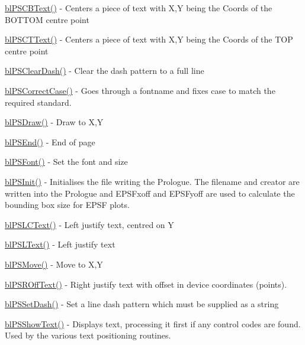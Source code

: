 \begin{DoxyItemize}
\item \hyperlink{ps_8c_ab05b586a42f786be51c5d36d41f7cb3c}{bl\-P\-S\-C\-B\-Text()} -\/ Centers a piece of text with X,Y being the Coords of the B\-O\-T\-T\-O\-M centre point
\item \hyperlink{ps_8c_af2c63afacbd6d47924bbb37724dee9e0}{bl\-P\-S\-C\-T\-Text()} -\/ Centers a piece of text with X,Y being the Coords of the T\-O\-P centre point
\item \hyperlink{ps_8c_ad49ff55fbd6be532c541cba2e7988b3b}{bl\-P\-S\-Clear\-Dash()} -\/ Clear the dash pattern to a full line
\item \hyperlink{ps_8c_a7593cf7ac25f517c2c7345fb9eb6c8b1}{bl\-P\-S\-Correct\-Case()} -\/ Goes through a fontname and fixes case to match the required standard.
\item \hyperlink{ps_8c_a86d363d40c83b86541ec7b2f54a986e4}{bl\-P\-S\-Draw()} -\/ Draw to X,Y
\item \hyperlink{ps_8c_a6c3a0f38cfad943f106bdcfc68c8d834}{bl\-P\-S\-End()} -\/ End of page
\item \hyperlink{ps_8c_aa19bba7a14d304e4c2a3e10ad86a6842}{bl\-P\-S\-Font()} -\/ Set the font and size
\item \hyperlink{ps_8c_ad788f19f0d7f1717404690c50e0f2edf}{bl\-P\-S\-Init()} -\/ Initialises the file writing the Prologue. The filename and creator are written into the Prologue and E\-P\-S\-Fxoff and E\-P\-S\-Fyoff are used to calculate the bounding box size for E\-P\-S\-F plots.
\item \hyperlink{ps_8c_a1f78f95f1baea85f3f6ef1ff6319f1cb}{bl\-P\-S\-L\-C\-Text()} -\/ Left justify text, centred on Y
\item \hyperlink{ps_8c_a0d50760c5dbef6223bca1e031ad1859e}{bl\-P\-S\-L\-Text()} -\/ Left justify text
\item \hyperlink{ps_8c_abb3f40999331b890f2015ce976b773e3}{bl\-P\-S\-Move()} -\/ Move to X,Y
\item \hyperlink{ps_8c_a11f0c0c7cb0b957efd91710af757ddb6}{bl\-P\-S\-R\-Off\-Text()} -\/ Right justify text with offset in device coordinates (points).
\item \hyperlink{ps_8c_a504120eff8dcea68e5d53c6799418df3}{bl\-P\-S\-Set\-Dash()} -\/ Set a line dash pattern which must be supplied as a string
\item \hyperlink{ps_8c_aa6663929221f535885fba918295e9432}{bl\-P\-S\-Show\-Text()} -\/ Displays text, processing it first if any control codes are found. Used by the various text positioning routines.

\end{DoxyItemize}
